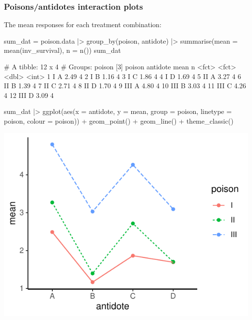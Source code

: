 \documentclass[a4paper]{article}
\begin{document}
\subsubsection{Poisons/antidotes interaction plots}
The mean responses for each treatment combination:
\begin{Schunk}
\begin{Sinput}
sum_dat = poison.data |> group_by(poison, antidote) |> 
  summarise(mean = mean(inv_survival),
            n = n())
sum_dat
\end{Sinput}
\begin{Soutput}
# A tibble: 12 x 4
# Groups:   poison [3]
   poison antidote  mean     n
   <fct>  <fct>    <dbl> <int>
 1 I      A         2.49     4
 2 I      B         1.16     4
 3 I      C         1.86     4
 4 I      D         1.69     4
 5 II     A         3.27     4
 6 II     B         1.39     4
 7 II     C         2.71     4
 8 II     D         1.70     4
 9 III    A         4.80     4
10 III    B         3.03     4
11 III    C         4.26     4
12 III    D         3.09     4
\end{Soutput}
\end{Schunk}
\begin{minipage}[t]{0.49\textwidth}
\begin{Schunk}
\begin{Sinput}
sum_dat |> 
  ggplot(aes(x = antidote, y = mean,
             group = poison, 
             linetype = poison,
             colour = poison)) + 
  geom_point() +
  geom_line() + 
  theme_classic()
\end{Sinput}


{\centering \includegraphics[width=\maxwidth]{figure/listings-unnamed-chunk-316-1} 

}

\end{Schunk}
\end{minipage}
\end{document}
